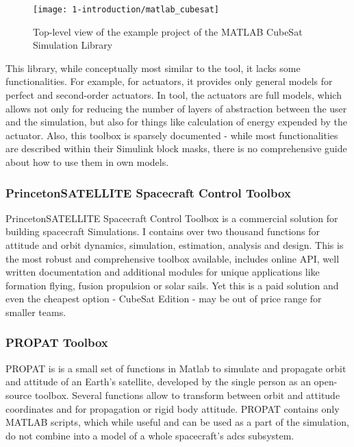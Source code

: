         \begin{figure}[h]
            \centering
            \texttt{[image: 1-introduction/matlab\_cubesat]}
            \caption{Top-level view of the example project of the MATLAB CubeSat Simulation Library}
            \label{fig:matlab_cubesat}
        \end{figure}

        This library, while conceptually most similar to the \ac{tool}, it lacks some functionalities. For example, for actuators, it provides only general models for perfect and second-order actuators. In \ac{tool}, the actuators are full models, which allows not only for reducing the number of layers of abstraction between the user and the simulation, but also for things like calculation of energy expended by the actuator. Also, this toolbox is sparsely documented - while most functionalities are described within their Simulink block masks, there is no comprehensive guide about how to use them in own models.


    \subsubsection{PrincetonSATELLITE Spacecraft Control Toolbox}
        PrincetonSATELLITE Spacecraft Control Toolbox is a commercial solution for building spacecraft Simulations. I contains over two thousand functions for attitude and orbit dynamics, simulation, estimation, analysis and design. This is the most robust and comprehensive toolbox available, includes online API, well written documentation and additional modules for unique applications like formation flying, fusion propulsion or solar sails. Yet this is a paid solution and even the cheapest option - CubeSat Edition - may be out of price range for smaller teams.

    \subsubsection{PROPAT Toolbox}
        PROPAT is is a small set of functions in Matlab to simulate and propagate orbit and attitude of an Earth's satellite, developed by the single person as an open-source toolbox. Several functions allow to transform between orbit and attitude coordinates and for propagation or rigid body attitude. PROPAT contains only MATLAB scripts, which while useful and can be used as a part of the simulation, do not combine into a model of a whole spacecraft's \ac{adcs} subsystem.

